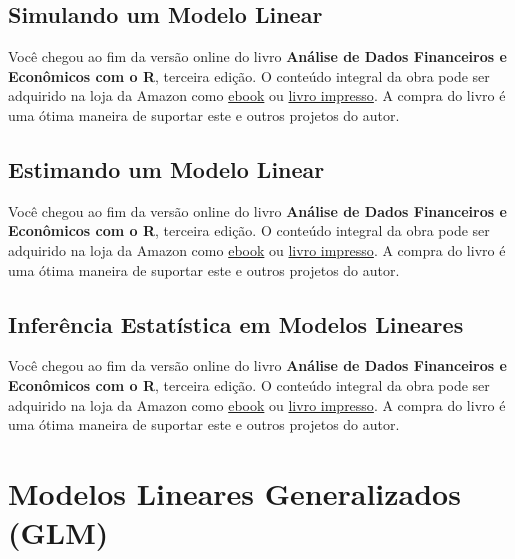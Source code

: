 \documentclass[
  11pt,
]{book}
\newenvironment{pleasebuyit}
{\begin{noteblock}
		
	} {\end{noteblock}}
\begin{document}
\hypertarget{simulando-um-modelo-linear}{%
\subsection{Simulando um Modelo Linear}\label{simulando-um-modelo-linear}}

\begin{pleasebuyit}
Você chegou ao fim da versão online do livro \textbf{Análise de Dados
Financeiros e Econômicos com o R}, terceira edição. O conteúdo integral
da obra pode ser adquirido na loja da Amazon como
\href{https://www.amazon.com.br/dp/B08WNC27ZY}{ebook} ou
\href{https://www.amazon.com/dp/B08WP8CCDB}{livro impresso}. A compra do
livro é uma ótima maneira de suportar este e outros projetos do autor.
\end{pleasebuyit}

\hypertarget{estimating-ols}{%
\subsection{Estimando um Modelo Linear}\label{estimating-ols}}

\begin{pleasebuyit}
Você chegou ao fim da versão online do livro \textbf{Análise de Dados
Financeiros e Econômicos com o R}, terceira edição. O conteúdo integral
da obra pode ser adquirido na loja da Amazon como
\href{https://www.amazon.com.br/dp/B08WNC27ZY}{ebook} ou
\href{https://www.amazon.com/dp/B08WP8CCDB}{livro impresso}. A compra do
livro é uma ótima maneira de suportar este e outros projetos do autor.
\end{pleasebuyit}

\hypertarget{testing-ols}{%
\subsection{Inferência Estatística em Modelos Lineares}\label{testing-ols}}

\begin{pleasebuyit}
Você chegou ao fim da versão online do livro \textbf{Análise de Dados
Financeiros e Econômicos com o R}, terceira edição. O conteúdo integral
da obra pode ser adquirido na loja da Amazon como
\href{https://www.amazon.com.br/dp/B08WNC27ZY}{ebook} ou
\href{https://www.amazon.com/dp/B08WP8CCDB}{livro impresso}. A compra do
livro é uma ótima maneira de suportar este e outros projetos do autor.
\end{pleasebuyit}

\hypertarget{modelos-lineares-generalizados-glm}{%
\section{Modelos Lineares Generalizados (GLM)}\label{modelos-lineares-generalizados-glm}}
\end{document}
